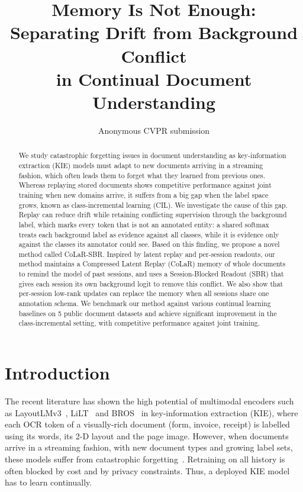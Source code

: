 \documentclass[10pt,twocolumn,letterpaper]{article}
\title{Memory Is Not Enough: Separating Drift from Background Conflict\\in Continual Document Understanding}
\author{Anonymous CVPR submission}
\begin{document}
\maketitle

\begin{abstract}
We study catastrophic forgetting issues in document understanding as key-information extraction (KIE) models must adapt to new documents arriving in a streaming fashion, which often leads them to forget what they learned from previous ones. Whereas replaying stored documents shows competitive performance against joint training when new domains arrive, it suffers from a big gap when the label space grows, known as class-incremental learning (CIL). We investigate the cause of this gap. Replay can reduce drift while retaining conflicting supervision through the background label, which marks every token that is not an annotated entity: a shared softmax treats each background label as evidence against all classes, while it is evidence only against the classes its annotator could see. Based on this finding, we propose a novel method called CoLaR-SBR. Inspired by latent replay and per-session readouts, our method maintains a Compressed Latent Replay (CoLaR) memory of whole documents to remind the model of past sessions, and uses a Session-Blocked Readout (SBR) that gives each session its own background logit to remove this conflict. We also show that per-session low-rank updates can replace the memory when all sessions share one annotation schema. We benchmark our method against various continual learning baselines on 5 public document datasets and achieve significant improvement in the class-incremental setting, with competitive performance against joint training.
\end{abstract}

\section{Introduction}
\label{sec:intro}

The recent literature has shown the high potential of multimodal encoders such as LayoutLMv3~\citep{huang2022layoutlmv3}, LiLT~\citep{wang2022lilt} and BROS~\citep{hong2022bros} in key-information extraction (KIE), where each OCR token of a visually-rich document (form, invoice, receipt) is labelled using its words, its 2-D layout and the page image. However, when documents arrive in a streaming fashion, with new document types and growing label sets, these models suffer from catastrophic forgetting~\citep{mccloskey1989catastrophic}. Retraining on all history is often blocked by cost and by privacy constraints. Thus, a deployed KIE model has to learn continually.
\end{document}
